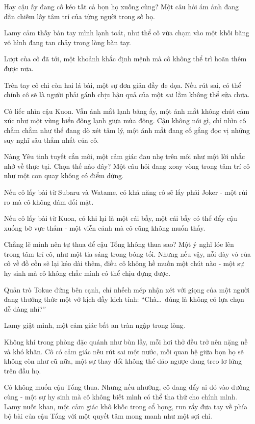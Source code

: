 \documentclass[../main.tex]{subfiles}
\begin{document}
Hay cậu ấy đang cố kéo tất cả bọn họ xuống cùng? Một câu hỏi ám ảnh đang dần chiếm lấy tâm trí của từng người trong số họ.

\il

Lamy cảm thấy bàn tay mình lạnh toát, như thể cô vừa chạm vào một khối băng vô hình đang tan chảy trong lòng bàn tay.

Lượt của cô đã tới, một khoảnh khắc định mệnh mà cô không thể trì hoãn thêm được nữa.

Trên tay cô chỉ còn hai lá bài, một sự đơn giản đầy đe dọa. Nếu rút sai, có thể chính cô sẽ là người phải gánh chịu hậu quả của một sai lầm không thể sửa chữa.

Cô liếc nhìn cậu Kuon. Vẫn ánh mắt lạnh băng ấy, một ánh mắt không chút cảm xúc như một vùng biển đông lạnh giữa mùa đông. Cậu không nói gì, chỉ nhìn cô chằm chằm như thể đang dò xét tâm lý, một ánh mắt đang cố gắng đọc vị những suy nghĩ sâu thẳm nhất của cô.

Nàng Yêu tinh tuyết cắn môi, một cảm giác đau nhẹ trên môi như một lời nhắc nhở về thực tại. Chọn thế nào đây? Một câu hỏi đang xoay vòng trong tâm trí cô như một con quay không có điểm dừng.

Nếu cô lấy bài từ Subaru và Watame, có khả năng cô sẽ lấy phải Joker - một rủi ro mà cô không dám đối mặt.

Nếu cô lấy bài từ Kuon, có khi lại là một cái bẫy, một cái bẫy có thể đẩy cậu xuống bờ vực thẳm - một viễn cảnh mà cô cũng không muốn thấy.

Chẳng lẽ mình nên tự thua để cậu Tổng không thua sao? Một ý nghĩ lóe lên trong tâm trí cô, như một tia sáng trong bóng tối. Nhưng nếu vậy, nỗi dày vò của cô về đồ cồn sẽ lại kéo dài thêm, điều cô không hề muốn một chút nào - một sự hy sinh mà cô không chắc mình có thể chịu đựng được.

Quản trò Tokue đứng bên cạnh, chỉ nhếch mép nhận xét với giọng của một người đang thưởng thức một vở kịch đầy kịch tính: ``Chà\dots\ đúng là không có lựa chọn dễ dàng nhỉ?''

Lamy giật mình, một cảm giác bất an tràn ngập trong lòng.

Không khí trong phòng đặc quánh như bùn lầy, mỗi hơi thở đều trở nên nặng nề và khó khăn. Cô có cảm giác nếu rút sai một nước, mối quan hệ giữa bọn họ sẽ không còn như cũ nữa, một sự thay đổi không thể đảo ngược đang treo lơ lửng trên đầu họ.

Cô không muốn cậu Tổng thua. Nhưng nếu nhường, cô đang đẩy ai đó vào đường cùng - một sự hy sinh mà cô không biết mình có thể tha thứ cho chính mình. Lamy nuốt khan, một cảm giác khô khốc trong cổ họng, run rẩy đưa tay về phía bộ bài của cậu Tổng với một quyết tâm mong manh như một sợi chỉ.
\end{document}
